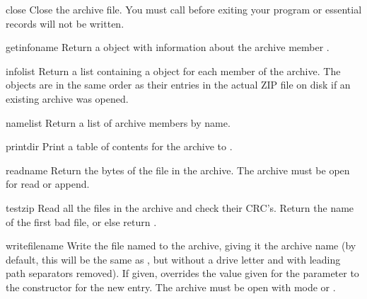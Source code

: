\begin{methoddesc}{close}{}
  Close the archive file.  You must call  before
  exiting your program or essential records will not be written. 
\end{methoddesc}

\begin{methoddesc}{getinfo}{name}
  Return a  object with information about the archive
  member .
\end{methoddesc}

\begin{methoddesc}{infolist}{}
  Return a list containing a  object for each member of
  the archive.  The objects are in the same order as their entries in
  the actual ZIP file on disk if an existing archive was opened.
\end{methoddesc}

\begin{methoddesc}{namelist}{}
  Return a list of archive members by name.
\end{methoddesc}

\begin{methoddesc}{printdir}{}
  Print a table of contents for the archive to .
\end{methoddesc}

\begin{methoddesc}{read}{name}
  Return the bytes of the file in the archive.  The archive must be
  open for read or append.
\end{methoddesc}

\begin{methoddesc}{testzip}{}
  Read all the files in the archive and check their CRC's.  Return the
  name of the first bad file, or else return .
\end{methoddesc}

\begin{methoddesc}{write}{filename}
  Write the file named  to the archive, giving it the
  archive name  (by default, this will be the same as
  , but without a drive letter and with leading path
  separators removed).  If given,  overrides the value
  given for the  parameter to the constructor for
  the new entry.  The archive must be open with mode  or
  .
\end{methoddesc}

